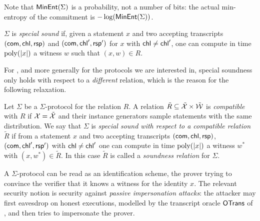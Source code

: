 Note that $\mathsf{MinEnt}(\Sigma)$ is a probability, not a number of bits: the
actual min-entropy of the commitment is $-\log(\mathsf{MinEnt}(\Sigma))$.

\begin{definition}\label{def:ss}
    $\Sigma$ is \emph{special sound} if, given a statement $x$ and two accepting
    transcripts $(\mathsf{com}, \mathsf{chl}, \mathsf{rsp})$ and $(\mathsf{com}, \mathsf{chl}', \mathsf{rsp}')$ for $x$ with
    $\mathsf{chl} \neq \mathsf{chl}'$, one can compute in time $\operatorname{poly}(\lvert x \rvert)$ a witness
    $w$ such that $(x,w) \in R$.
\end{definition}

For \sqisign{}, and more generally for the protocols we are interested in,
special soundness only holds with respect to a \emph{different} relation, which
is the reason for the following relaxation.

\begin{definition}\label{def:sound-rel}
    Let $\Sigma$ be a $\Sigma$-protocol for the relation $R$.
    A relation $\tilde{R} \subseteq \tilde{\mathcal{X}} \times \tilde{\mathcal{W}}$ is
    \emph{compatible} with $R$ if $\mathcal{X} = \tilde{\mathcal{X}}$ and their instance
    generators sample statements with the same distribution.
    We say that $\Sigma$ is \emph{special sound with respect to a compatible
    relation $\tilde{R}$} if from a statement $x$ and two accepting transcripts
    $(\mathsf{com}, \mathsf{chl}, \mathsf{rsp})$, $(\mathsf{com}, \mathsf{chl}', \mathsf{rsp}')$ with $\mathsf{chl} \neq \mathsf{chl}'$
    one can compute in time $\operatorname{poly}(\lvert x \rvert)$ a witness $w^*$ with $(x, w^*) \in
    \tilde{R}$.
    In this case $\tilde{R}$ is called a \emph{soundness relation} for $\Sigma$.
\end{definition}

A $\Sigma$-protocol can be read as an identification scheme, the prover trying
to convince the verifier that it knows a witness for the identity $x$.
The relevant security notion is security against \emph{passive impersonation
attacks}: the attacker may first eavesdrop on honest executions, modelled by the
transcript oracle $\mathsf{OTrans}$ of , and then tries to impersonate
the prover.

